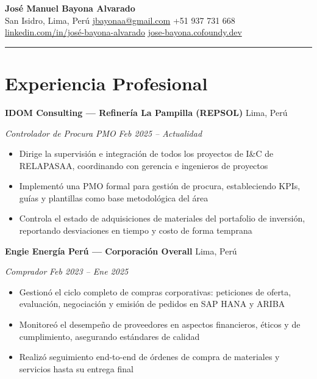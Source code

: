 \documentclass[10.5pt,letterpaper]{article}
\newcommand{\entry}[4]{%
  \noindent\textbf{#1} \hfill #2 \par\nopagebreak
  \textit{#3} \hfill \textit{#4} \par\nopagebreak
}
\begin{document}
\begin{center}
  {\LARGE\bfseries José Manuel Bayona Alvarado} \\[3pt]
  \enspace San Isidro, Lima, Perú
  \quad{}\enspace \href{mailto:jbayonaa@gmail.com}{jbayonaa@gmail.com}
  \quad{}\enspace +51 937 731 668
  \\[2pt]
  \enspace \href{https://www.linkedin.com/in/jos%C3%A9-bayona-alvarado-007309107}{linkedin.com/in/josé-bayona-alvarado}
  \quad{}\enspace \href{https://jose-bayona.cofoundy.dev}{jose-bayona.cofoundy.dev}
\end{center}

\vspace{-0.4em}
\noindent\rule{\textwidth}{0.8pt}
\vspace{-0.8em}

\section{Experiencia Profesional}

\entry{IDOM Consulting — Refinería La Pampilla (REPSOL)}{Lima, Perú}{Controlador de Procura PMO}{Feb 2025 -- Actualidad}
\begin{itemize}
  \item Dirige la supervisión e integración de todos los proyectos de I\&C de RELAPASAA, coordinando con gerencia e ingenieros de proyectos
  \item Implementó una PMO formal para gestión de procura, estableciendo KPIs, guías y plantillas como base metodológica del área
  \item Controla el estado de adquisiciones de materiales del portafolio de inversión, reportando desviaciones en tiempo y costo de forma temprana
\end{itemize}
\vspace{0.2em}

\entry{Engie Energía Perú — Corporación Overall}{Lima, Perú}{Comprador}{Feb 2023 -- Ene 2025}
\begin{itemize}
  \item Gestionó el ciclo completo de compras corporativas: peticiones de oferta, evaluación, negociación y emisión de pedidos en SAP HANA y ARIBA
  \item Monitoreó el desempeño de proveedores en aspectos financieros, éticos y de cumplimiento, asegurando estándares de calidad
  \item Realizó seguimiento end-to-end de órdenes de compra de materiales y servicios hasta su entrega final
\end{itemize}
\vspace{0.2em}
\end{document}
